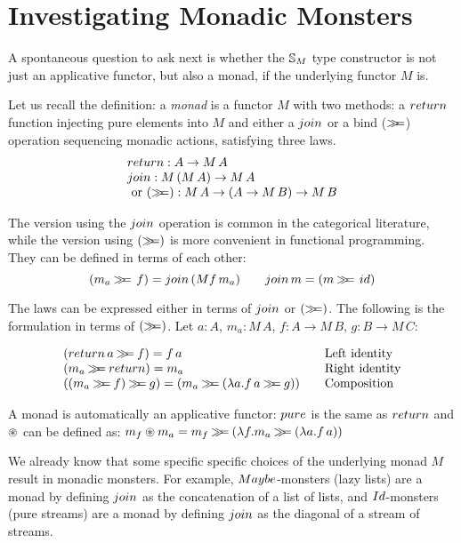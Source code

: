 \section{Investigating Monadic Monsters}\label{sec:monad}

A spontaneous question to ask next is whether the $\mathbb{S}_{M}$ type constructor is not just an applicative functor, but also a monad, if the underlying functor $M$ is.

Let us recall the definition: a {\em monad}
is a functor $M$ with two methods: a $\return$ function injecting pure elements into $M$ and either a $\join$ or a bind ($\mathbin{\gg\!\!=}$) operation sequencing monadic actions, satisfying three laws.
$$
\begin{array}{l}
\return : A \rightarrow M\, A \\
\join : M\,(M\, A) \rightarrow M\, A\\
\mbox{ or }
(\bind) : M\, A \rightarrow (A \rightarrow M\, B) \rightarrow M\, B
\end{array}
$$

The version using the $\join$ operation is common in the categorical literature, while the version using $(\mathbin{\gg\!\!=})$ is more convenient in functional programming.
They can be defined in terms of each other:
$$
(m_a \bind\, f) = \join \, (M f\, m_a) \qquad
\join\, m = (m \bind\,\id)
$$


The laws can be expressed either in terms of $\join$ or $(\mathbin{\gg\!\!=})$.
The following is the formulation in terms of $(\mathbin{\gg\!\!=})$.
Let $a:A$, $m_a : M\, A$,
$f : A \rightarrow M\, B$, $g : B \rightarrow M\,C$:

$$
\begin{array}{l@{\qquad}l}
(\return\,a \bind  f) = f\, a
  & \mbox{Left identity} \\
(m_a \bind \return) = m_a
  & \mbox{Right identity} \\
((m_a \bind f) \bind g) = (m_a \bind (\lambda a.  f\, a  \bind  g))
  & \mbox{Composition} \\
\end{array}
$$

A monad is automatically an applicative functor:
$\apure$ is the same as $\return$ and $\circledast$ can be defined as:
$
m_f\circledast m_a = m_f \mathbin{\gg\!\!=} (\lambda f. m_a \mathbin{\gg\!\!=} (\lambda a. f\,a))
$

We already know that some specific specific choices of the underlying monad $M$  result in monadic monsters.
For example, $\maybe$-monsters (lazy lists) are a monad by defining $\join$ as the concatenation of a list of lists, and $\Id$-monsters (pure streams) are a monad by defining $\join$ as the diagonal of a stream of streams.


